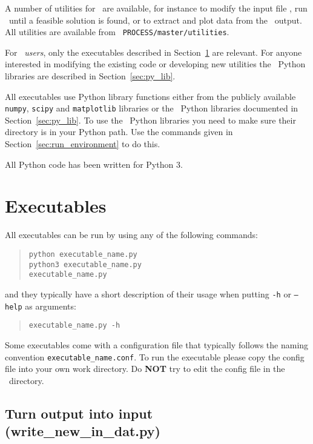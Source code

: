 \label{chap:utilities}

A number of utilities for \process\ are available, for instance to modify the
input file \indat, run \process\ until a feasible solution is found, or to
extract and plot data from the \process\ output. All utilities are available
from \texttt{~PROCESS/master/utilities}.

For \process\ \textit{users}, only the executables described in
Section~\ref{sec:py_exec} are relevant. For anyone interested in modifying the
existing code or developing new utilities the \process\ Python
libraries are described in Section~\ref{sec:py_lib}.

All executables use Python library functions either from the publicly
available \texttt{numpy}, \texttt{scipy} and \texttt{matplotlib} libraries or
the \process\ Python libraries documented in Section~\ref{sec:py_lib}. To use
the \process\ Python libraries you need to make sure their directory is in
your Python path. Use the commands given in Section~\ref{sec:run_environment} to
do this.

All Python code has been written for Python 3.

\section{Executables}
\label{sec:py_exec}

All executables can be run by using any of the following commands:
\begin{quote}
\begin{verbatim}
python executable_name.py
python3 executable_name.py
executable_name.py
\end{verbatim}
\end{quote}
and they typically have a short description of their usage when putting
\texttt{-h} or \texttt{--help} as arguments:
\begin{quote}
\begin{verbatim}
executable_name.py -h
\end{verbatim}
\end{quote}

Some executables come with a configuration file that typically follows the
naming convention \texttt{executable\_name.conf}. To run the executable please
copy the config file into your own work directory. Do \textbf{NOT} try to edit
the config file in the \process\ directory.

\subsection{Turn output into input (write\_new\_in\_dat.py)}

